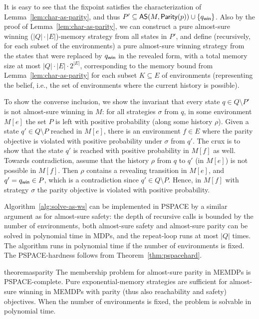 \documentclass[a4paper,USenglish,cleveref, autoref, thm-restate]{lipics-v2021}
\def\abs#1{\ensuremath{\lvert #1 \rvert}}
\newcommand\almostsure{\textrm{\sf AS}}
\newcommand\Parity{\textrm{\sf Parity}}
\def\winabsorb{q_{\sf win}}
\begin{document}
It is easy to see that the fixpoint satisfies the characterization 
of Lemma~\ref{lem:char-as-parity}, and thus 
$P' \subseteq \almostsure(M,\Parity(p)) \cup \{\winabsorb\}$.
Also by the proof of Lemma~\ref{lem:char-as-parity}, we can construct a pure almost-sure winning ($\abs{Q}\cdot\abs{E}$)-memory strategy from all states in $P'$, and define (recursively, for each subset of the environments) a pure almost-sure winning strategy from the states that were replaced by $\winabsorb$ in the revealed form, with a total memory size at most $\abs{Q}\cdot\abs{E} \cdot 2^{\abs{E}}$,
corresponding to the memory bound
from Lemma~\ref{lem:char-as-parity}
for each subset $K \subseteq E$ of environments (representing the belief, i.e., the set of environments where the current history is possible).



To show the converse inclusion, we show the invariant that
every state $q \in Q \setminus P'$ is not almost-sure winning in $M$:
for all strategies $\sigma$ from $q$, in some environment $M[e]$ the set $P$ is left 
with positive probability (along some history $\rho$). Given a state $q' \in Q \setminus P$ reached in $M[e]$,
there is an environment $f \in E$ where the parity objective is violated
with positive probability under $\sigma$ from $q'$.  The crux is to show that 
the state $q'$ is reached with positive probability
in $M[f]$ as well.
Towards contradiction, assume that the history $\rho$ from $q$ to $q'$ (in $M[e]$)
is not possible in $M[f]$. Then $\rho$ contains a revealing transition in $M[e]$,
and $q' = \winabsorb \in P$, which is a contradiction since $q' \in Q \setminus P$. 
Hence, in $M[f]$ with strategy $\sigma$ the parity objective is violated
with positive probability.


Algorithm~\ref{alg:solve-as-ws} can be implemented in PSPACE by a similar argument
as for almost-sure safety: the depth of recursive calls is bounded by the number
of environments, both almost-sure safety and almost-sure parity can be solved 
in polynomial time in MDPs, and the repeat-loop runs at most $\abs{Q}$ times.
The algorithm runs in polynomial time if the number of environments is fixed.
The PSPACE-hardness follows from Theorem~\ref{thm:pspacehard}.


\begin{restatable}{theorem}{asparity}
\label{th:as-parity}
	The membership problem for almost-sure parity in MEMDPs is PSPACE-complete.
	Pure exponential-memory strategies are sufficient for almost-sure winning in MEMDPs with parity (thus also reachability and safety)
	objectives. When the number of environments is fixed, the problem is solvable in polynomial time.
\end{restatable}
\end{document}
